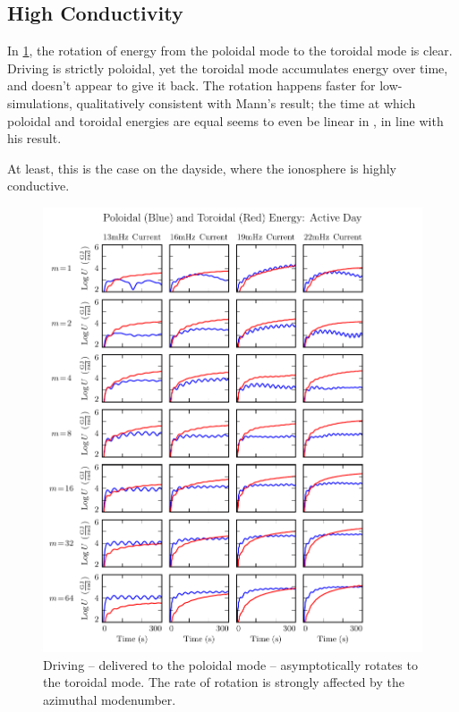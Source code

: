 \subsection{High Conductivity}

In \cref{fig_U_day}, the rotation of energy from the poloidal mode to the toroidal mode is clear. Driving is strictly poloidal, yet the toroidal mode accumulates energy over time, and doesn't appear to give it back. The rotation happens faster for low-\azm simulations, qualitatively consistent with Mann's result; the time at which poloidal and toroidal energies are equal seems to even be linear in \azm, in line with his result. 

At least, this is the case on the dayside, where the ionosphere is highly conductive. 

\begin{figure}[H]
    \centering
    \includegraphics[width=\textwidth]{figures/U_1.pdf}
    \caption[Poloidal and Toroidal Energy: Active Day]{
      Driving -- delivered to the poloidal mode -- asymptotically rotates to the toroidal mode. The rate of rotation is strongly affected by the azimuthal modenumber. 
    }
    \label{fig_U_day}
\end{figure}

